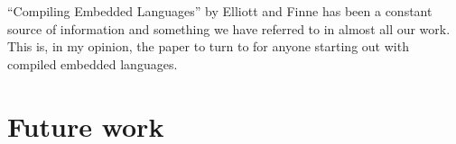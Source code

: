 \documentclass[a4paper]{book}
\begin{document}
``Compiling Embedded Languages'' by Elliott and Finne has been a constant source of information 
and something we have referred to in almost all our work. This is, in my opinion, the paper to turn 
to for anyone starting out with compiled embedded languages. 






\FloatBarrier
%
%
\section{Future work} 
\label{sec:thesisFUTURE}
\end{document}
